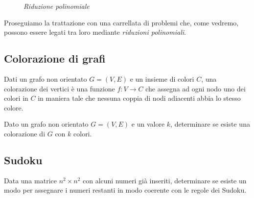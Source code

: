 \begin{figure}[h!]
\centering
{}
\caption{\emph{Riduzione polinomiale}}
\end{figure}

\noindent
Proseguiamo la trattazione con una carrellata di problemi che, come vedremo,
possono essere legati tra loro mediante \emph{riduzioni polinomiali}.

\subsection{Colorazione di grafi}
\begin{definition}
    Dati un grafo non orientato $G=(V,E)$ e un insieme di colori $C$, una
    colorazione dei vertici è una funzione $f:V\to C$ che assegna ad ogni nodo
    uno dei colori in $C$ in maniera tale che nessuna coppia di nodi adiacenti
    abbia lo stesso colore.
\end{definition}
\begin{problem}
    Dato un grafo non orientato $G=(V,E)$ e un valore $k$, determinare se
    esiste una colorazione di $G$ con $k$ colori.
\end{problem}

\subsection{Sudoku}
\begin{problem}
    Data una matrice $n^2\times n^2$ con alcuni numeri già inseriti, determinare
    se esiste un modo per assegnare i numeri restanti in modo coerente con le
    regole dei Sudoku.
\end{problem}

